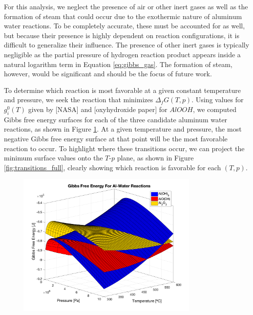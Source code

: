 \documentclass[preprint,12pt,3p]{elsarticle}
\begin{document}
For this analysis, we neglect the presence of air or other inert gases as well
as the formation of steam that could occur due to the exothermic nature of
aluminum water reactions. To be completely accurate, these must be accounted for
as well, but because their presence is highly dependent on reaction
configurations, it is difficult to generalize their influence. The presence of
other inert gases is typically negligible as the partial pressure of hydrogen
reaction product appears inside a natural logarithm term in Equation
\ref{eq:gibbs_gas}. The formation of steam, however, would be significant and
should be the focus of future work.

To determine which reaction is most favorable at a given constant temperature
and pressure, we seek the reaction that minimizes $\Delta_f G(T,p)$. Using
values for $g_i^0(T)$ given by [NASA] and [oxyhydroxide paper] for $AlOOH$, we
computed Gibbs free energy surfaces for each of the three candidate aluminum
water reactions, as shown in Figure \ref{fig:gibbs_surface}. At a given
temperature and pressure, the most negative Gibbs free energy surface at that
point will be the most favorable reaction to occur. To highlight where these
transitions occur, we can project the minimum surface values onto the $T$-$p$
plane, as shown in Figure \ref{fig:transitions_full}, clearly showing which reaction
is favorable for each $(T,p)$.

\begin{figure}
  \centering
  \includegraphics[width=0.8\textwidth]{fig/gibbs_total_surface}
  \label{fig:gibbs_surface}
\end{figure}
\end{document}
